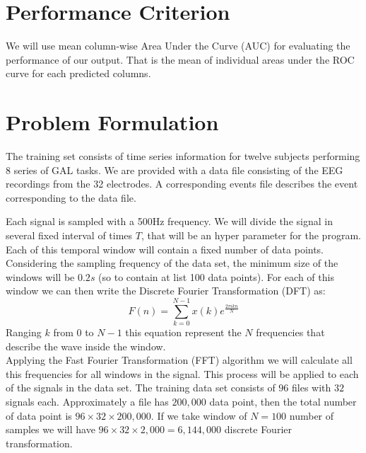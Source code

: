 \documentclass[final,leqno,onefignum,onetabnum]{siamltexmm}
\begin{document}
\section{Performance Criterion}
We will use mean column-wise Area Under the Curve (AUC) for evaluating the performance of our output.  That is the mean of individual areas under the ROC curve for each predicted columns.

\section{Problem Formulation}
The training set consists of time series information for twelve subjects performing 8 series of GAL tasks.  We are provided with a data file consisting of the EEG recordings from the 32 electrodes.  A corresponding events file describes the event corresponding to the data file.



Each signal is sampled with a 500Hz frequency. We will divide the signal in several fixed interval of times $T$, that will be an hyper parameter for the program. Each of this temporal window will contain a fixed number of data points. Considering the sampling frequency of the data set, the minimum size of the windows will be $0.2 s$ (so to contain at list 100 data points). 
For each of this window we can then write the Discrete Fourier Transformation (DFT) as:
\begin {equation}\label{DFT}
F(n) =\sum_{k=0}^{N-1}x(k)e^{\frac{2\pi i kn}{N}}
\end{equation}  
Ranging $k$ from $0$ to $N-1$ this equation represent the $N$ frequencies that describe the wave inside the window.\\
Applying the Fast Fourier Transformation (FFT) algorithm\cite{FFT} we will calculate all this frequencies for all windows in the signal. This process will be applied to each of the signals in the data set. The training data set consists of $96$ files with $32$ signals each. Approximately a file has $200,000$ data point, then the total number of data point is $96\times 32 \times 200,000$. If we take window of $N=100$ number of samples we will have $96\times 32 \times 2,000=6,144,000$ discrete Fourier transformation. 
\end{document}
